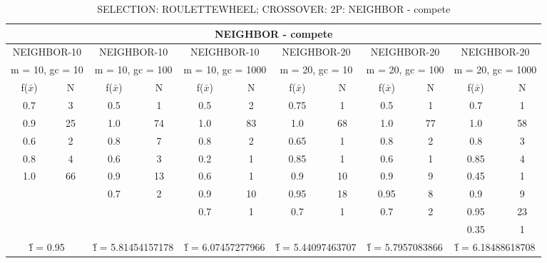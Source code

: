 \begin{table}[H]
	\centering
	\caption{SELECTION: ROULETTEWHEEL; CROSSOVER: 2P: NEIGHBOR - compete}
	\begin{adjustbox}{width=1\textwidth}
		\begin{tabular}{ |c|c||c|c||c|c||c|c||c|c||c|c| }
			\hline
			\multicolumn{12}{|c|}{NEIGHBOR - compete} \\
			\hline
			\multicolumn{2}{|c||}{NEIGHBOR-10} & \multicolumn{2}{c||}{NEIGHBOR-10} & \multicolumn{2}{c||}{NEIGHBOR-10} & \multicolumn{2}{c||}{NEIGHBOR-20} & \multicolumn{2}{c||}{NEIGHBOR-20} & \multicolumn{2}{c|}{NEIGHBOR-20}\\
			\hline
			\multicolumn{2}{|c||}{m = 10, gc = 10} & \multicolumn{2}{c||}{m = 10, gc = 100} & \multicolumn{2}{c||}{m = 10, gc = 1000} & \multicolumn{2}{c||}{m = 20, gc = 10} & \multicolumn{2}{c||}{m = 20, gc = 100} & \multicolumn{2}{c|}{m = 20, gc = 1000}\\
			\hline
			f($\bar{x}$) & N & f($\bar{x}$) & N & f($\bar{x}$) & N & f($\bar{x}$) & N & f($\bar{x}$) & N & f($\bar{x}$) & N\\
			\hline
			\hline
			0.7 & 3 & 0.5 & 1 & 0.5 & 2 & 0.75 & 1 & 0.5 & 1 & 0.7 & 1\\
			0.9 & 25 & 1.0 & 74 & 1.0 & 83 & 1.0 & 68 & 1.0 & 77 & 1.0 & 58\\
			0.6 & 2 & 0.8 & 7 & 0.8 & 2 & 0.65 & 1 & 0.8 & 2 & 0.8 & 3\\
			0.8 & 4 & 0.6 & 3 & 0.2 & 1 & 0.85 & 1 & 0.6 & 1 & 0.85 & 4\\
			1.0 & 66 & 0.9 & 13 & 0.6 & 1 & 0.9 & 10 & 0.9 & 9 & 0.45 & 1\\
			&   & 0.7 & 2 & 0.9 & 10 & 0.95 & 18 & 0.95 & 8 & 0.9 & 9\\
			&   &   &   & 0.7 & 1 & 0.7 & 1 & 0.7 & 2 & 0.95 & 23\\
			&   &   &   &   &   &   &   &   &   & 0.35 & 1\\
			\hline
			\multicolumn{2}{|c||}{\^{f} = 0.95} & \multicolumn{2}{c||}{\^{f} = 5.81454157178} & \multicolumn{2}{c||}{\^{f} = 6.07457277966} & \multicolumn{2}{c||}{\^{f} = 5.44097463707} & \multicolumn{2}{c||}{\^{f} = 5.7957083866} & \multicolumn{2}{c|}{\^{f} = 6.18488618708}\\
			\hline
		\end{tabular}
	\end{adjustbox}
\end{table}
